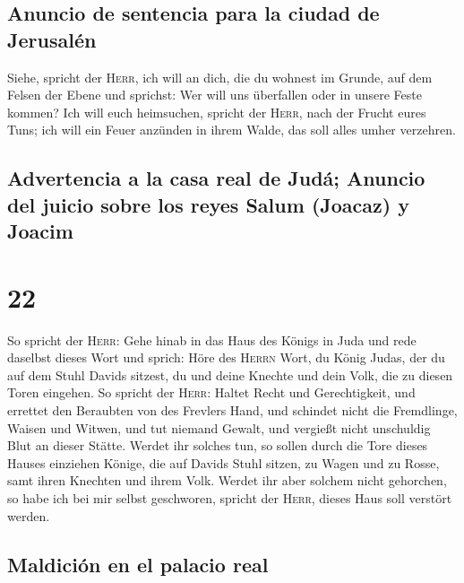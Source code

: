 \hypertarget{anuncio-de-sentencia-para-la-ciudad-de-jerusaluxe9n}{%
\subsection{Anuncio de sentencia para la ciudad de
Jerusalén}\label{anuncio-de-sentencia-para-la-ciudad-de-jerusaluxe9n}}

 Siehe, spricht der \textsc{Herr}, ich will an dich, die
du wohnest im Grunde, auf dem Felsen der Ebene und sprichst: Wer will
uns überfallen oder in unsere Feste kommen?  Ich will
euch heimsuchen, spricht der \textsc{Herr}, nach der Frucht eures Tuns;
ich will ein Feuer anzünden in ihrem Walde, das soll alles umher
verzehren.

\hypertarget{advertencia-a-la-casa-real-de-juduxe1-anuncio-del-juicio-sobre-los-reyes-salum-joacaz-y-joacim}{%
\subsection{Advertencia a la casa real de Judá; Anuncio del juicio sobre
los reyes Salum (Joacaz) y
Joacim}\label{advertencia-a-la-casa-real-de-juduxe1-anuncio-del-juicio-sobre-los-reyes-salum-joacaz-y-joacim}}

\hypertarget{section-21}{%
\section{22}\label{section-21}}

 So spricht der \textsc{Herr}: Gehe hinab in das Haus des
Königs in Juda und rede daselbst dieses Wort  und sprich:
Höre des \textsc{Herrn} Wort, du König Judas, der du auf dem Stuhl
Davids sitzest, du und deine Knechte und dein Volk, die zu diesen Toren
eingehen.  So spricht der \textsc{Herr}: Haltet Recht und
Gerechtigkeit, und errettet den Beraubten von des Frevlers Hand, und
schindet nicht die Fremdlinge, Waisen und Witwen, und tut niemand
Gewalt, und vergießt nicht unschuldig Blut an dieser Stätte.
 Werdet ihr solches tun, so sollen durch die Tore dieses
Hauses einziehen Könige, die auf Davids Stuhl sitzen, zu Wagen und zu
Rosse, samt ihren Knechten und ihrem Volk.  Werdet ihr
aber solchem nicht gehorchen, so habe ich bei mir selbst geschworen,
spricht der \textsc{Herr}, dieses Haus soll verstört werden.

\hypertarget{maldiciuxf3n-en-el-palacio-real}{%
\subsection{Maldición en el palacio
real}\label{maldiciuxf3n-en-el-palacio-real}}

